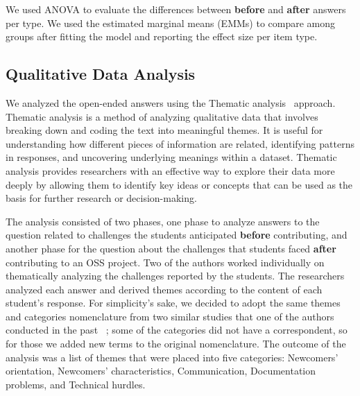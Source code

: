 \documentclass[sigconf]{acmart}
\begin{document}
\begin{sloppy}
We used ANOVA to evaluate the differences between \textbf{before} and \textbf{after} answers per type. We used the estimated marginal means (EMMs) to compare among groups after fitting the model and reporting the effect size per item type.



\subsection{Qualitative Data Analysis}

We analyzed the open-ended answers using the Thematic analysis~\cite{braun2012thematic} approach. Thematic analysis is a method of analyzing qualitative data that involves breaking down and coding the text into meaningful themes. It is useful for understanding how different pieces of information are related, identifying patterns in responses, and uncovering underlying meanings within a dataset. Thematic analysis provides researchers with an effective way to explore their data more deeply by allowing them to identify key ideas or concepts that can be used as the basis for further research or decision-making.

The analysis consisted of two phases, one phase to analyze answers to the question related to challenges the students anticipated \textbf{before} contributing, and another phase for the question about the challenges that students faced \textbf{after} contributing to an OSS project. Two of the authors worked individually on thematically analyzing the challenges reported by the students. The researchers analyzed each answer and derived themes according to the content of each student's response. For simplicity's sake, we decided to adopt the same themes and categories nomenclature from two similar studies that one of the authors conducted in the past ~\cite{steinmacher2019overcoming, balali2018newcomers}; some of the categories did not have a correspondent, so for those we added new terms to the original nomenclature. The outcome of the analysis was a list of themes that were placed into five categories: Newcomers' orientation, Newcomers' characteristics, Communication, Documentation problems, and Technical hurdles.


\end{sloppy}
\end{document}
